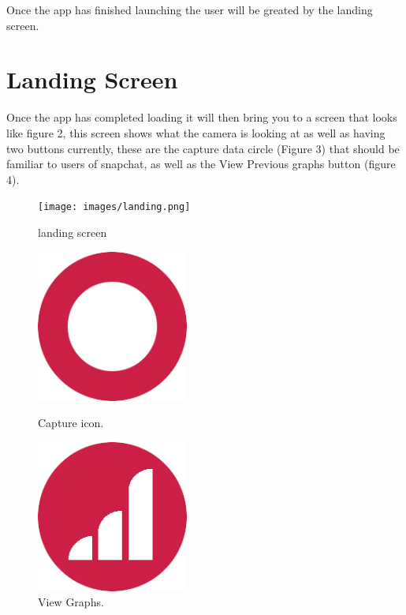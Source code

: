 \documentclass[a4paper,12pt]{article}
\begin{document}
Once the app has finished launching the user will be greated by the landing screen.
\section{Landing Screen}
Once the app has completed loading it will then bring you to a screen that looks like figure 2, this screen shows what the camera is looking at as well as having two buttons currently, these are the capture data circle (Figure 3) that should be familiar to users of snapchat, as well as the View Previous graphs button (figure 4).

\begin{figure}[H]
\centering
	\texttt{[image: images/landing.png]}
	\caption{landing screen \label{overflow}}
\end{figure}

\begin{figure}[H]
  \centering
  \begin{minipage}[b]{0.4\textwidth}
    \includegraphics[width=50mm]{images/capture.png}
    \caption{Capture icon.}
  \end{minipage}
  \hfill
  \begin{minipage}[b]{0.4\textwidth}
    \includegraphics[width=50mm]{images/graphRed.png}
    \caption{View Graphs.}
  \end{minipage}
\end{figure}
\end{document}
